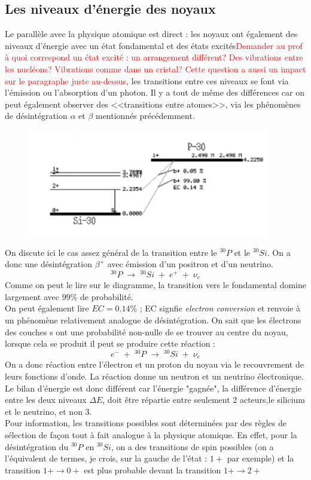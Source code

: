 \subsection{Les niveaux d'énergie des noyaux}
Le parallèle avec la physique atomique est direct : les noyaux ont également des niveaux d'énergie avec un état fondamental et des états excités\textcolor{red}{Demander au prof à quoi correspond un état excité : un arrangement différent? Des vibrations entre les nucléons? Vibrations comme dans un cristal? Cette question a aussi un impact sur le paragraphe juste au-dessus}, les transitions entre ces niveaux se font via l'émission ou l'absorption d'un photon. Il y a tout de même des différences car on peut également observer des <<transitions entre atomes>>, via les phénomènes de désintégration $\alpha$ et $\beta$ mentionnés précédemment.

\begin{figure}[H]
    \centering
    \includegraphics[scale=1.3]{Images4/NiveauxAtomes.PNG}
\end{figure}

On discute ici le cas assez général de la transition entre le $^{30}P$ et le $^{30}Si$. On a donc une désintégration $\beta^+$ avec émission d'un positron et d'un neutrino.
\[
    ^{30}P \; \longrightarrow \; ^{30}Si \; + \; e^+ \; + \; \nu_e
\]
Comme on peut le lire sur le diagramme, la transition vers le fondamental domine largement avec $99\%$ de probabilité.\\
On peut également lire $EC = 0.14\%$ ; EC signfie \emph{electron conversion} et renvoie à un phénomène relativement analogue de désintégration. On sait que les électrons des couches s ont une probabilité non-nulle de se trouver au centre du noyau, lorsque cela se produit il peut se produire cette réaction :
\[
    e^- \; + \; ^{30}P \; \longrightarrow \; ^{30}Si \; + \; \nu_e
\]
On a donc réaction entre l'électron et un proton du noyau via le recouvrement de leurs fonctions d'onde. La réaction donne un neutron et un neutrino électronique. Le bilan d'énergie est donc différent car l'énergie "gagnée", la différence d'énergie entre les deux niveaux $\Delta E$, doit être répartie entre seulement 2 acteurs,le silicium et le neutrino, et non 3.\\
Pour information, les transitions possibles sont déterminées par des règles de sélection de façon tout à fait analogue à la physique atomique. En effet, pour la désintégration du $^{30}P$ en $^{30}Si$, on a des transitions de spin possibles (on a l'équivalent de termes, je crois, sur la gauche de l'état : $1+$ par exemple) et la transition $1+ \rightarrow 0+$ est plus probable devant la transition $1+ \rightarrow 2+$







